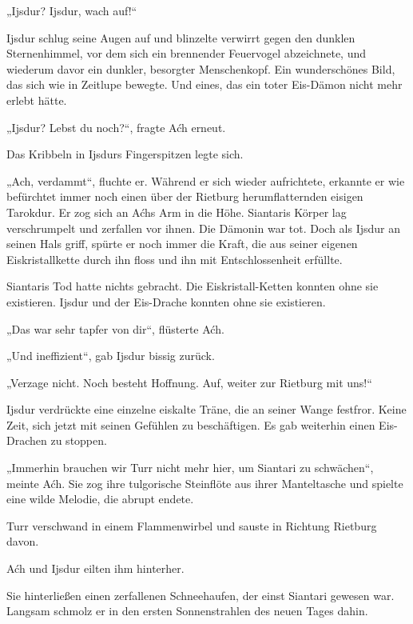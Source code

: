 \trennzeichen



„Ijsdur? Ijsdur, wach auf!“

Ijsdur schlug seine Augen auf und blinzelte verwirrt gegen den dunklen Sternenhimmel, vor dem sich ein brennender Feuervogel abzeichnete, und wiederum davor ein dunkler, besorgter Menschenkopf. Ein wunderschönes Bild, das sich wie in Zeitlupe bewegte. Und eines, das ein toter Eis-Dämon nicht mehr erlebt hätte.

„Ijsdur? Lebst du noch?“, fragte Aćh erneut.

Das Kribbeln in Ijsdurs Fingerspitzen legte sich.

„Ach, verdammt“, fluchte er. Während er sich wieder aufrichtete, erkannte er wie befürchtet immer noch einen über der Rietburg herumflatternden eisigen Tarokdur. Er zog sich an Aćhs Arm in die Höhe. Siantaris Körper lag verschrumpelt und zerfallen vor ihnen. Die Dämonin war tot. Doch als Ijsdur an seinen Hals griff, spürte er noch immer die Kraft, die aus seiner eigenen Eiskristallkette durch ihn floss und ihn mit Entschlossenheit erfüllte.

Siantaris Tod hatte nichts gebracht. Die Eiskristall-Ketten konnten ohne sie existieren. Ijsdur und der Eis-Drache konnten ohne sie existieren.

„Das war sehr tapfer von dir“, flüsterte Aćh.

„Und ineffizient“, gab Ijsdur bissig zurück.

„Verzage nicht. Noch besteht Hoffnung. Auf, weiter zur Rietburg mit uns!“

Ijsdur verdrückte eine einzelne eiskalte Träne, die an seiner Wange festfror. Keine Zeit, sich jetzt mit seinen Gefühlen zu beschäftigen. Es gab weiterhin einen Eis-Drachen zu stoppen.

„Immerhin brauchen wir Turr nicht mehr hier, um Siantari zu schwächen“, meinte Aćh. Sie zog ihre tulgorische Steinflöte aus ihrer Manteltasche und spielte eine wilde Melodie, die abrupt endete.

Turr verschwand in einem Flammenwirbel und sauste in Richtung Rietburg davon.

Aćh und Ijsdur eilten ihm hinterher.

Sie hinterließen einen zerfallenen Schneehaufen, der einst Siantari gewesen war. Langsam schmolz er in den ersten Sonnenstrahlen des neuen Tages dahin.



\trennzeichen



